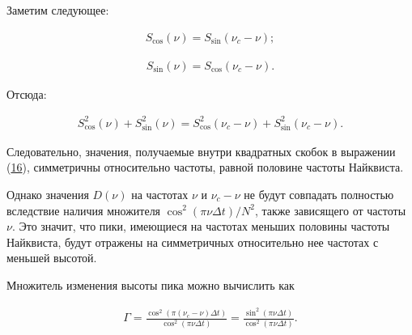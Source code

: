 \documentclass[12pt]{article}
\newcommand{\hl}[1]{(\hyperlink{eq:#1}{#1})}
\newcommand{\s}[2]{\hypertarget{skip:#1}{\vspace{#2pt}}}
\newcommand{\sd}[1]{\hypertarget{skip:#1}{\vspace{-10pt}}}
\begin{document}
Заметим следующее:

\sd{23}
\begin{gather}
    S_{\cos}(\nu) = S_{\sin}(\nu_{c} - \nu);
\end{gather}

\s{24}{-20}
\begin{gather}
    S_{\sin}(\nu) = S_{\cos}(\nu_{c} - \nu).
\end{gather}

Отсюда:

\sd{25}
\begin{gather}
    S_{\cos}^2(\nu) + S_{\sin}^2(\nu) = S_{\cos}^2(\nu_{c} - \nu) + S_{\sin}^2(\nu_{c} - \nu).
\end{gather}

Следовательно, значения, получаемые внутри квадратных скобок в выражении \hl{16}, симметричны относительно частоты, равной половине частоты Найквиста. \par

\vspace{\baselineskip}

Однако значения $ D(\nu) $ на частотах $ \nu $ и $ \nu_{c} - \nu $ не будут совпадать полностью вследствие наличия множителя $ \cos^2(\pi \nu \Delta t) / N^2 $, также зависящего от частоты $ \nu $. Это значит, что пики, имеющиеся на частотах меньших половины частоты Найквиста, будут отражены на симметричных относительно нее частотах с меньшей высотой. \par

\vspace{\baselineskip}

Множитель изменения высоты пика можно вычислить как

\sd{26}
\begin{gather}
    \Gamma = \frac{\cos^2(\pi (\nu_{c} - \nu) \Delta t) }{\cos^2(\pi \nu \Delta t) } = \frac{\sin^2(\pi \nu \Delta t) }{\cos^2(\pi \nu \Delta t) }.
\end{gather}
\end{document}
